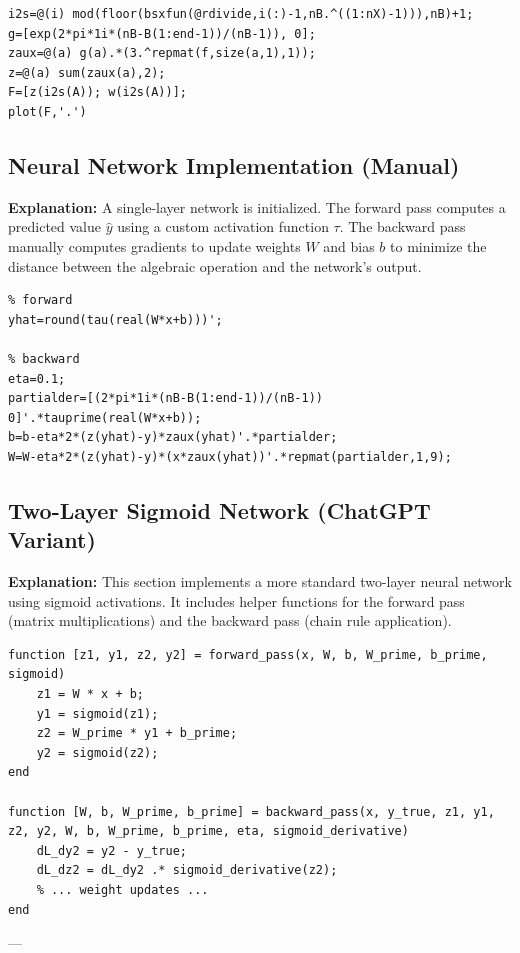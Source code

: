\begin{lstlisting}
i2s=@(i) mod(floor(bsxfun(@rdivide,i(:)-1,nB.^((1:nX)-1))),nB)+1;
g=[exp(2*pi*1i*(nB-B(1:end-1))/(nB-1)), 0];
zaux=@(a) g(a).*(3.^repmat(f,size(a,1),1));
z=@(a) sum(zaux(a),2);
F=[z(i2s(A)); w(i2s(A))];
plot(F,'.')
\end{lstlisting}

\subsection{Neural Network Implementation (Manual)}
\textbf{Explanation:} A single-layer network is initialized. The forward pass computes a predicted value $\hat{y}$ using a custom activation function $\tau$. The backward pass manually computes gradients to update weights $W$ and bias $b$ to minimize the distance between the algebraic operation and the network's output.

\begin{lstlisting}
% forward
yhat=round(tau(real(W*x+b)))'; 

% backward
eta=0.1;  
partialder=[(2*pi*1i*(nB-B(1:end-1))/(nB-1)) 0]'.*tauprime(real(W*x+b));
b=b-eta*2*(z(yhat)-y)*zaux(yhat)'.*partialder;
W=W-eta*2*(z(yhat)-y)*(x*zaux(yhat))'.*repmat(partialder,1,9);
\end{lstlisting}

\subsection{Two-Layer Sigmoid Network (ChatGPT Variant)}
\textbf{Explanation:} This section implements a more standard two-layer neural network using sigmoid activations. It includes helper functions for the forward pass (matrix multiplications) and the backward pass (chain rule application).

\begin{lstlisting}
function [z1, y1, z2, y2] = forward_pass(x, W, b, W_prime, b_prime, sigmoid)
    z1 = W * x + b;
    y1 = sigmoid(z1);
    z2 = W_prime * y1 + b_prime;
    y2 = sigmoid(z2);
end

function [W, b, W_prime, b_prime] = backward_pass(x, y_true, z1, y1, z2, y2, W, b, W_prime, b_prime, eta, sigmoid_derivative)
    dL_dy2 = y2 - y_true;
    dL_dz2 = dL_dy2 .* sigmoid_derivative(z2);
    % ... weight updates ...
end
\end{lstlisting}

---

